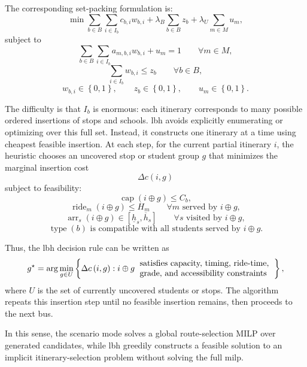 The corresponding set-packing formulation is:
\[
\min
\sum_{b\in B}\sum_{i\in I_b} c_{b,i}w_{b,i}
+ \lambda_B \sum_{b\in B} z_b
+ \lambda_U \sum_{m\in M} u_m ,
\]
subject to
\[
\sum_{b\in B}\sum_{i\in I_b} a_{m,b,i}w_{b,i} + u_m = 1
\qquad \forall m\in M,
\]
\[
\sum_{i\in I_b} w_{b,i} \le z_b
\qquad \forall b\in B,
\]
\[
w_{b,i}\in\left\{0,1\right\},
\qquad
z_b\in\left\{0,1\right\},
\qquad
u_m\in\left\{0,1\right\}.
\]

The difficulty is that \(I_b\) is enormous: each itinerary corresponds to many possible ordered insertions of stops and schools. \gls{lbh} avoids explicitly enumerating or optimizing over this full set. Instead, it constructs one itinerary at a time using cheapest feasible insertion. At each step, for the current partial itinerary \(i\), the heuristic chooses an uncovered stop or student group \(g\) that minimizes the marginal insertion cost
\[
\Delta c\left(i,g\right)
\]
subject to feasibility:
\[
\operatorname{cap}\left(i\oplus g\right) \le C_b,
\]
\[
\operatorname{ride}_m\left(i\oplus g\right) \le H_m
\qquad \forall m \text{ served by } i\oplus g,
\]
\[
\operatorname{arr}_{s}\left(i\oplus g\right) \in \left[\underline{h}_s,\overline{h}_s\right]
\qquad \forall s \text{ visited by } i\oplus g,
\]
\[
\operatorname{type}\left(b\right) \text{ is compatible with all students served by } i\oplus g.
\]

Thus, the \gls{lbh} decision rule can be written as
\[
g^\star
=
\arg\min_{g\in U}
\left\{
\Delta c\left(i,g\right)
:
i\oplus g \begin{tabular}{l} satisfies capacity, timing, ride-time, \\ grade, and accessibility constraints\end{tabular} %
\right\},
\]
where $U$ is the set of currently uncovered students or stops. The algorithm repeats this insertion step until no feasible insertion remains, then proceeds to the next bus.

In this sense, the scenario mode solves a global route-selection MILP over generated candidates, while \gls{lbh} greedily constructs a feasible solution to an implicit itinerary-selection problem without solving the full \gls{milp}.
